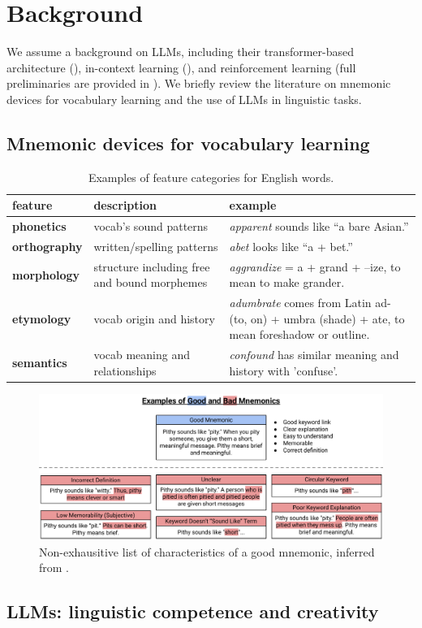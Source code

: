 
\section{Background}

We assume a background on LLMs, including their transformer-based architecture (), in-context learning (), and reinforcement learning (full preliminaries are provided in ). We briefly review the literature on mnemonic devices for vocabulary learning and the use of LLMs in linguistic tasks.

\subsection{Mnemonic devices for vocabulary learning}

\begin{table}[htb]
\centering
\caption{Examples of feature categories for English words.}
\label{tab:linguistic-features}
\begin{tabularx}{\textwidth}{l >{\raggedright\arraybackslash}X >{\raggedright\arraybackslash}X}
\toprule
\textbf{feature} & \textbf{description} & \textbf{example} \\
\midrule
\textbf{phonetics} & vocab's sound patterns & \emph{apparent} sounds like “a bare Asian.” \\
\addlinespace
\textbf{orthography} & written/spelling patterns & \emph{abet} looks like “a + bet.” \\
\addlinespace
\textbf{morphology} & structure including free and bound morphemes & \emph{aggrandize} = a + grand + –ize, to mean to make grander. \\
\addlinespace
\textbf{etymology} & vocab origin and history & \emph{adumbrate} comes from Latin ad- (to, on) + umbra (shade) + ate, to mean foreshadow or outline. \\
\addlinespace
\textbf{semantics} & vocab meaning and relationships & \emph{confound} has similar meaning and history with 'confuse'. \\
\bottomrule
\end{tabularx}
\end{table}

\begin{figure}
  \includegraphics[width=\linewidth]{figures/good_bad_mnemonics.pdf}
  \caption{Non-exhausitive list of characteristics of a good mnemonic, inferred from \citetext{\citealp{BalepurSMART2024}, \citealp{CamposUSING2011}, \citealp{SariogluUSE2024}}.}
  \label{fig:good-mnemonic}
\end{figure}
\subsection{LLMs: linguistic competence and creativity}
